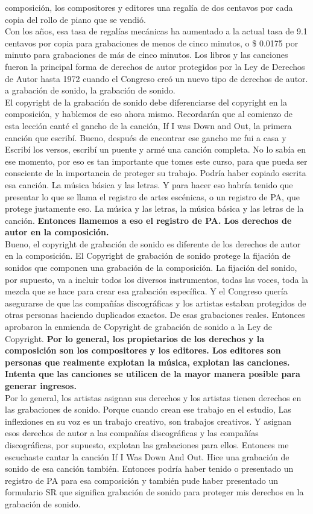 \documentclass[10pt]{book}
\begin{document}
composición, los compositores y editores una regalía de dos centavos por cada copia del rollo de piano que se vendió.\\
Con los años, esa tasa de regalías mecánicas ha aumentado a la actual tasa de 9.1 centavos por copia para grabaciones de menos de cinco minutos, o \$ 0.0175 por minuto para grabaciones de más de cinco minutos. Los libros y las canciones fueron la principal forma de derechos de autor protegidos por la Ley de Derechos de Autor hasta 1972 cuando el Congreso creó un nuevo tipo de derechos de autor.  a grabación de sonido, la grabación de sonido.\\
El copyright de la grabación de sonido debe diferenciarse del copyright en la composición, y hablemos de eso ahora mismo. Recordarán que al comienzo de esta lección canté el gancho de la canción, If I was Down and Out, la primera canción que escribí. Bueno, después de encontrar ese gancho me fui a casa y Escribí los versos, escribí un puente y armé una canción completa. No lo sabía en ese momento, por eso es tan importante que tomes este curso, para que pueda ser consciente de la importancia de proteger su trabajo. Podría haber copiado escrita esa canción. La música básica y las letras. Y para hacer eso habría tenido que presentar lo que se llama el registro de artes escénicas, o un registro de PA, que protege justamente eso. La música y las letras, la música básica y las letras de la canción.  \textbf{Entonces llamemos a eso el registro de PA. Los derechos de autor en la composición.}\\
Bueno, el copyright de grabación de sonido es diferente de los derechos de autor en la composición. El Copyright de grabación de sonido protege la fijación de sonidos que componen una grabación de la composición. La fijación del sonido, por supuesto, va a incluir todos los diversos instrumentos, todas las voces, toda la mezcla que se hace para crear esa grabación específica. Y el Congreso quería asegurarse de que las compañías discográficas y los artistas estaban protegidos de otras personas haciendo duplicados exactos. De esas grabaciones reales. Entonces aprobaron la enmienda de Copyright de grabación de sonido a la Ley de Copyright. \textbf{Por lo general, los propietarios de los derechos y la composición son los compositores y los editores. Los editores son personas que realmente explotan la música, explotan las canciones. Intenta que las canciones se utilicen de la mayor manera posible para generar ingresos.}\\
Por lo general, los artistas asignan sus derechos y los artistas tienen derechos en las grabaciones de sonido. Porque cuando crean ese trabajo en el estudio, Las inflexiones en su voz es un trabajo creativo, son trabajos creativos. Y asignan esos derechos de autor a las compañías discográficas y las compañías discográficas, por supuesto, explotan las grabaciones para ellos. Entonces me escuchaste cantar la canción If I Was Down And Out. Hice una grabación de sonido de esa canción también. Entonces podría haber tenido o presentado un registro de PA para esa composición y también pude haber presentado un formulario SR que significa grabación de sonido para proteger mis derechos en la grabación de sonido. \\
\end{document}
